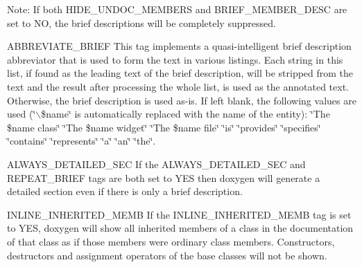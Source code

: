 \begin{DoxyDescription}
\begin{DoxyParagraph}{Note: }
If both {\ttfamily HIDE\_\-UNDOC\_\-MEMBERS} and {\ttfamily BRIEF\_\-MEMBER\_\-DESC} are set to {\ttfamily NO}, the brief descriptions will be completely suppressed.
\end{DoxyParagraph}
\label{config_cfg_abbreviate_brief}
\hypertarget{config_cfg_abbreviate_brief}{}
 
\item[{\ttfamily ABBREVIATE\_\-BRIEF} ] This tag implements a quasi-\/intelligent brief description abbreviator that is used to form the text in various listings. Each string in this list, if found as the leading text of the brief description, will be stripped from the text and the result after processing the whole list, is used as the annotated text. Otherwise, the brief description is used as-\/is. If left blank, the following values are used (\char`\"{}$\backslash$\$name\char`\"{} is automatically replaced with the name of the entity): \char`\"{}The \$name class\char`\"{} \char`\"{}The \$name widget\char`\"{} \char`\"{}The \$name file\char`\"{} \char`\"{}is\char`\"{} \char`\"{}provides\char`\"{} \char`\"{}specifies\char`\"{} \char`\"{}contains\char`\"{} \char`\"{}represents\char`\"{} \char`\"{}a\char`\"{} \char`\"{}an\char`\"{} \char`\"{}the\char`\"{}.

\label{config_cfg_always_detailed_sec}
\hypertarget{config_cfg_always_detailed_sec}{}
 
\item[{\ttfamily ALWAYS\_\-DETAILED\_\-SEC} ] If the {\ttfamily ALWAYS\_\-DETAILED\_\-SEC} and {\ttfamily REPEAT\_\-BRIEF} tags are both set to {\ttfamily YES} then doxygen will generate a detailed section even if there is only a brief description.

\label{config_cfg_inline_inherited_memb}
\hypertarget{config_cfg_inline_inherited_memb}{}
 
\item[{\ttfamily INLINE\_\-INHERITED\_\-MEMB} ] If the {\ttfamily INLINE\_\-INHERITED\_\-MEMB} tag is set to {\ttfamily YES}, doxygen will show all inherited members of a class in the documentation of that class as if those members were ordinary class members. Constructors, destructors and assignment operators of the base classes will not be shown.

\label{config_cfg_full_path_names}
\hypertarget{config_cfg_full_path_names}{}
 

\end{DoxyDescription}

